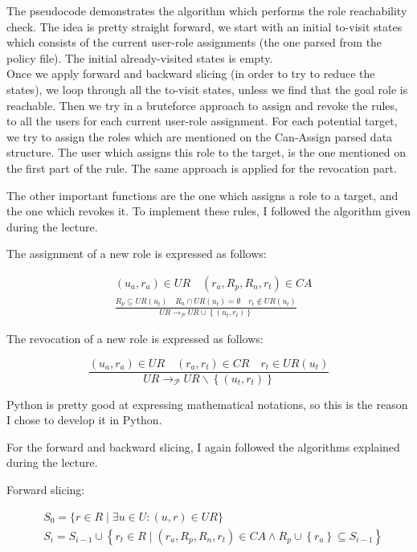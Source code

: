 \documentclass[12pt]{article}
\begin{document}
The pseudocode demonstrates the algorithm which performs the role reachability check.
The idea is pretty straight forward, we start with an initial to-visit states which consists of the current user-role
assignments (the one parsed from the policy file). The initial already-visited states is empty. \\

Once we apply forward and backward slicing (in order to try to reduce the states), we loop through all the to-visit states,
unless we find that the goal role is reachable. Then we try in a bruteforce approach to assign and revoke the rules, to all the
users for each current user-role assignment.
For each potential target, we try to assign the roles which are mentioned on the Can-Assign parsed data structure.
The user which assigns this role to the target, is the one mentioned on the first part of the rule.
The same approach is applied for the revocation part.


The other important functions are the one which assigns a role to a target, and the one which revokes it.
To implement these rules, I followed the algorithm given during the lecture. 

The assignment of a new role is expressed as follows:

$$ \begin{aligned}
&\left(u_{a}, r_{a}\right) \in U R \quad\left(r_{a}, R_{p}, R_{n}, r_{t}\right) \in C A\\
&\frac{R_{p} \subseteq U R\left(u_{t}\right) \quad R_{n} \cap U R\left(u_{t}\right)=\emptyset \quad r_{t} \notin U R\left(u_{t}\right)}{U R \rightarrow_{\mathcal{P}} U R \cup\left\{\left(u_{t}, r_{t}\right)\right\}}
\end{aligned} $$

The revocation of a new role is expressed as follows:

$$
\frac{\left(u_{a}, r_{a}\right) \in U R \quad\left(r_{a}, r_{t}\right) \in C R \quad r_{t} \in U R\left(u_{t}\right)}{U R \rightarrow_{\mathcal{P}} U R \backslash\left\{\left(u_{t}, r_{t}\right)\right\}}
$$

Python is pretty good at expressing mathematical notations, so this is the reason I chose to develop it in Python.

For the forward and backward slicing, I again followed the algorithms explained during the lecture.

Forward slicing:

$$
\begin{aligned}
&S_{0}=\{r \in R \mid \exists u \in U:(u, r) \in U R\} \\
&S_{i}=S_{i-1} \cup\left\{r_{t} \in R \mid\left(r_{a}, R_{p}, R_{n}, r_{t}\right) \in C A \wedge R_{p} \cup\left\{r_{a}\right\} \subseteq S_{i-1}\right\}
\end{aligned}
$$
\end{document}
